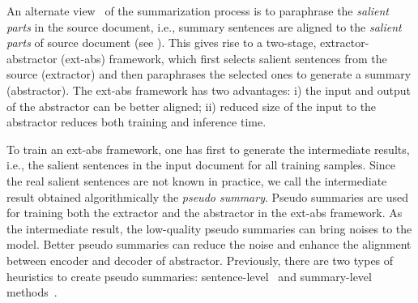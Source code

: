 An alternate view~\cite{FastAbs18, summlevel19} of the summarization process is to
paraphrase the \textit{salient parts} in the source document, i.e.,
summary sentences are aligned to the \textit{salient parts} of source document
(see ).
This gives rise to a two-stage, extractor-abstractor (ext-abs) framework,
which first selects salient sentences from the source
(extractor) and then 
paraphrases the selected ones to generate a summary (abstractor). 
The ext-abs framework has two advantages: i) the input and output
of the abstractor can be better aligned;
ii) reduced size of the input to the abstractor reduces both training and
inference time.

To train an ext-abs framework, one has first to generate the intermediate
results, i.e., the salient sentences in the input document for all
training samples. 
Since the real salient sentences are not known in practice, we call 
the intermediate result obtained algorithmically the {\em pseudo summary}. 
Pseudo summaries are used for training both the extractor and the abstractor
in the ext-abs framework. 
As the intermediate result, the low-quality pseudo summaries can   
bring noises to the model.
Better pseudo summaries can reduce the noise and enhance the alignment between 
encoder and decoder of abstractor.
Previously, there are two types of heuristics to create pseudo summaries: 
sentence-level~\cite{FastAbs18}  and summary-level methods~\cite{NallapatiAAAI17, SharmaHHW19}.

